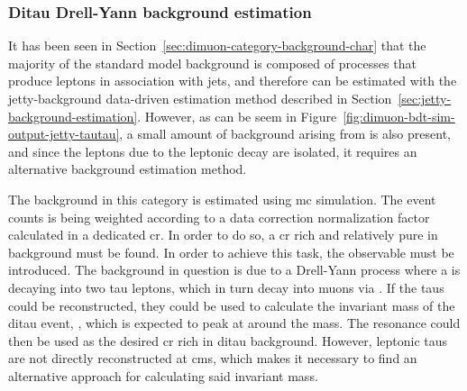 \subsubsection{Ditau Drell-Yann background estimation}
\label{sec:mtautau-background-estimation}

It has been seen in Section~\ref{sec:dimuon-category-background-char} that the majority of the standard model background is composed of processes that produce leptons in association with jets, and therefore can be estimated with the jetty-background data-driven estimation method described in Section~\ref{sec:jetty-background-estimation}. However, as can be seem in Figure~\ref{fig:dimuon-bdt-sim-output-jetty-tautau}, a small amount of background arising from \ztautau is also present, and since the leptons due to the leptonic decay \tautomu are isolated, it requires an alternative background estimation method.

The \ztautau background in this category is estimated using \gls{mc} simulation. The event counts is being weighted according to a data correction normalization factor calculated in a dedicated \gls{cr}. In order to do so, a \gls{cr} rich and relatively pure in \ztautau background must be found. In order to achieve this task, the observable \mtautau must be introduced. The background in question is due to a Drell-Yann process where a \PZ is decaying into two tau leptons, which in turn decay into muons via \tautomu. If the taus could be reconstructed, they could be used to calculate the invariant mass of the ditau event, \mtautau, which is expected to peak at around the \PZ mass. The \PZ resonance could then be used as the desired \gls{cr} rich in ditau background. However, leptonic taus are not directly reconstructed at \gls{cms}, which makes it necessary to find an alternative approach for calculating said invariant mass.

